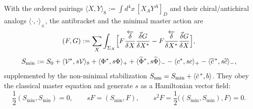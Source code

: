 With the ordered pairings $\langle X,Y\rangle_8:=\int d^4x\,[X_AY^A]_D$ and their chiral/antichiral analogs $\langle\cdot,\cdot\rangle_\pm$, the antibracket and the minimal master action are
\begin{equation}\label{eq:gaugebv:antibracket}
(F,G):=\sum_X\int_{\Sigma_X}\Bigl[
F\frac{\overleftarrow\delta}{\delta X}\frac{\vec\delta G}{\delta X^*}
-F\frac{\overleftarrow\delta}{\delta X^*}\frac{\vec\delta G}{\delta X}\Bigr],
\end{equation}
\begin{equation}\label{eq:gaugebv:Smin}
S_{\min}:=S_0
+\langle\mathcal{V}^*,s\mathcal{V}\rangle_8
+\langle\Phi^*,s\Phi\rangle_+
+\langle\widetilde\Phi^*,s\widetilde\Phi\rangle_-
-\langle c^*,sc\rangle_+
-\langle\widetilde c^{\,*},s\widetilde c\rangle_-,
\end{equation}
supplemented by the non-minimal stabilization $S_{\rm nm}=S_{\min}+\langle\bar c^{\,*},b\rangle$. They obey the classical master equation and generate $s$ as a Hamiltonian vector field:
\begin{equation}\label{eq:gaugebv:CME}
\frac12(S_{\min},S_{\min})=0,\qquad
sF=(S_{\min},F),\qquad
s^2F=\frac12\bigl((S_{\min},S_{\min}),F\bigr)=0.
\end{equation}

